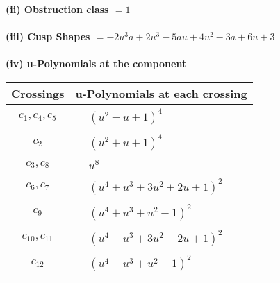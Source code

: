 \documentclass[1p]{elsarticle_modified}
\theoremstyle{definition}
\begin{document}
\flushleft \textbf{(ii) Obstruction class $= 1$}\\~\\
\flushleft \textbf{(iii) Cusp Shapes $= -2 u^3 a+2 u^3-5 a u+4 u^2-3 a+6 u+3$}\\~\\
\newpage\renewcommand{\arraystretch}{1}
\flushleft \textbf{(iv) u-Polynomials at the component}\newline \\
\begin{tabular}{m{50pt}|m{274pt}}
Crossings & \hspace{64pt}u-Polynomials at each crossing \\
\hline $$\begin{aligned}c_{1},c_{4},c_{5}\end{aligned}$$&$\begin{aligned}
&(u^2- u+1)^4
\end{aligned}$\\
\hline $$\begin{aligned}c_{2}\end{aligned}$$&$\begin{aligned}
&(u^2+u+1)^4
\end{aligned}$\\
\hline $$\begin{aligned}c_{3},c_{8}\end{aligned}$$&$\begin{aligned}
&u^8
\end{aligned}$\\
\hline $$\begin{aligned}c_{6},c_{7}\end{aligned}$$&$\begin{aligned}
&(u^4+u^3+3 u^2+2 u+1)^2
\end{aligned}$\\
\hline $$\begin{aligned}c_{9}\end{aligned}$$&$\begin{aligned}
&(u^4+u^3+u^2+1)^2
\end{aligned}$\\
\hline $$\begin{aligned}c_{10},c_{11}\end{aligned}$$&$\begin{aligned}
&(u^4- u^3+3 u^2-2 u+1)^2
\end{aligned}$\\
\hline $$\begin{aligned}c_{12}\end{aligned}$$&$\begin{aligned}
&(u^4- u^3+u^2+1)^2
\end{aligned}$\\
\hline
\end{tabular}\\~\\
\end{document}
